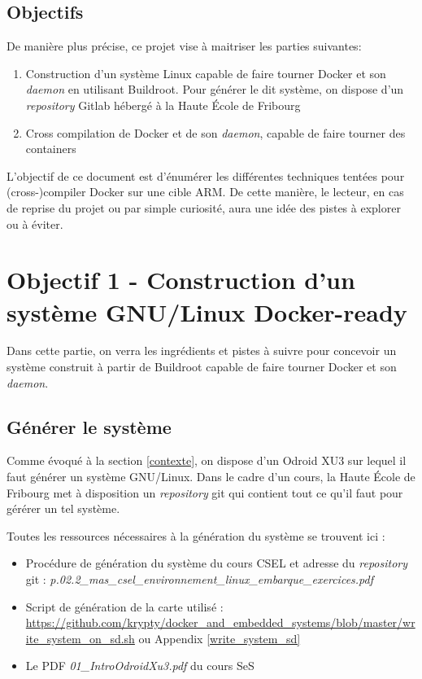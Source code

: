 \documentclass[11pt,a4paper,oneside]{report}
\begin{document}
\section{Objectifs}

De manière plus précise, ce projet vise à maitriser les parties suivantes:

\begin{enumerate}
  \item Construction d'un système Linux capable de faire tourner Docker et son \emph{daemon} en utilisant Buildroot. Pour générer le dit système, on dispose d'un \emph{repository} Gitlab hébergé à la Haute École de Fribourg

  \item Cross compilation de Docker et de son \emph{daemon}, capable de faire tourner des containers
\end{enumerate}

L'objectif de ce document est d'énumérer les différentes techniques tentées pour (cross-)compiler Docker sur une cible ARM. De cette manière, le lecteur, en cas de reprise du projet ou par simple curiosité, aura une idée des pistes à explorer ou à éviter.



\chapter{Objectif 1 - Construction d'un système GNU/Linux Docker-ready}

Dans cette partie, on verra les ingrédients et pistes à suivre pour concevoir un système construit à partir de Buildroot capable de faire tourner Docker et son \emph{daemon}.

\section{Générer le système}

Comme évoqué à la section \ref{contexte}, on dispose d'un Odroid XU3 sur lequel il faut générer un système GNU/Linux. Dans le cadre d'un cours, la Haute École de Fribourg met à disposition un \emph{repository} git qui contient tout ce qu'il faut pour gérérer un tel système.

Toutes les ressources nécessaires à la génération du système se trouvent ici :

\begin{itemize}
  \item Procédure de génération du système du cours CSEL et adresse du \textit{repository} git : \emph{\newline p.02.2\_mas\_csel\_environnement\_linux\_embarque\_exercices.pdf}
  \item Script de génération de la carte utilisé : \url{https://github.com/krypty/docker\_and\_embedded\_systems/blob/master/write\_system\_on\_sd.sh} ou Appendix \ref{write_system_sd}
  \item Le PDF \emph{01\_IntroOdroidXu3.pdf} du cours SeS
\end{itemize}
\end{document}
